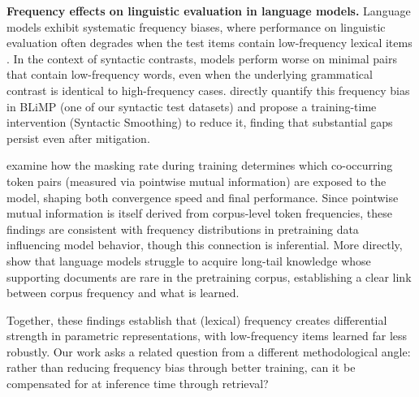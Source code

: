 \noindent \textbf{Frequency effects on linguistic evaluation in language models.}
Language models exhibit systematic frequency biases, where performance on linguistic evaluation often degrades when the test items contain low-frequency lexical items \citep{wei-etal-2021-frequency,kim2022uncontrolled}. In the context of syntactic contrasts, models perform worse on minimal pairs that contain low-frequency words, even when the underlying grammatical contrast is identical to high-frequency cases. \citet{diehl-martinez-etal-2024-mitigating} directly quantify this frequency bias in BLiMP (one of our syntactic test datasets) and propose a training-time intervention (Syntactic Smoothing) to reduce it, finding that substantial gaps persist even after mitigation. 


\citet{wettig-etal-2023-mask} examine how the masking rate during training determines which co-occurring token pairs (measured via pointwise mutual information) are exposed to the model, shaping both convergence speed and final performance. Since pointwise mutual information is itself derived from corpus-level token frequencies, these findings are consistent with frequency distributions in pretraining data influencing model behavior, though this connection is inferential. More directly, \citet{kandpal2023large} show that language models struggle to acquire long-tail knowledge whose supporting documents are rare in the pretraining corpus, establishing a clear link between corpus frequency and what is learned.

Together, these findings establish that (lexical) frequency creates differential strength in parametric representations, with low-frequency items learned far less robustly. Our work asks a related question from a different methodological angle: rather than reducing frequency bias through better training, can it be compensated for at inference time through retrieval?

